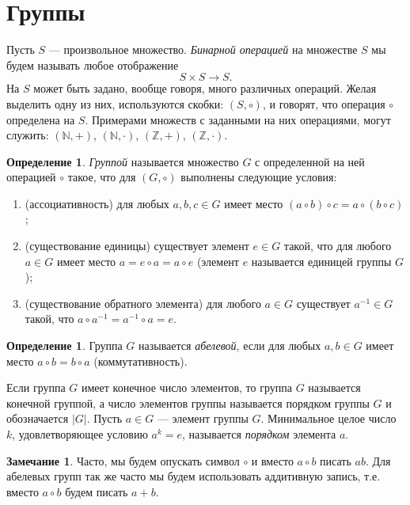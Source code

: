 \documentclass[12pt, titlepage, oneside]{amsbook}
\newcommand{\NN}{\mathbb{N}}
\newcommand{\ZZ}{\mathbb{Z}}
\theoremstyle{definition}
\newtheorem{definition}[theorem]{Определение}
\newtheorem{remark}[theorem]{Замечание}
\theoremstyle{remark}
\begin{document}
\section{Группы}

Пусть $S$ --- произвольное множество. \emph{Бинарной операцией} на
множестве $S$ мы будем называть любое отображение
$$S\times S\rightarrow S.$$ На $S$ может быть задано, вообще говоря, много различных
операций. Желая выделить одну из них, используются скобки:
$(S,\circ)$, и говорят, что операция $\circ$  определена на $S$.
Примерами множеств с заданными на них операциями, могут служить:
$(\NN,+)$, $(\NN,\cdot)$, $(\ZZ,+)$, $(\ZZ,\cdot)$.

\begin{definition}
	\emph{Группой} называется множество $G$ с определенной на ней операцией
	$\circ$ такое, что для $(G,\circ)$ выполнены следующие условия:
	\begin{enumerate}
		\item (ассоциативность) для любых $a,b,c\in G$ имеет место $(a\circ b)\circ
			      c=a\circ (b\circ c)$;
		\item (существование единицы) существует элемент $e\in G$ такой, что
		      для любого $a\in G$ имеет место $a=e\circ a=a\circ e$ (элемент $e$
		      называется единицей группы $G$);
		\item (существование обратного элемента) для любого $a\in G$
		      существует $a^{-1}\in G$ такой, что $a\circ a^{-1}=a^{-1}\circ a=e$.
	\end{enumerate}
\end{definition}

\begin{definition}
	Группа $G$ называется \emph{абелевой}, если для любых $a,b\in G$
	имеет место $a\circ b=b\circ a$ (коммутативность).
\end{definition}

Если группа $G$ имеет конечное число элементов, то группа $G$
называется конечной группой, а число элементов группы называется
порядком группы $G$ и обозначается $|G|$. Пусть $a\in G$ --- элемент
группы $G$. Минимальное целое число $k$, удовлетворяющее условию
$a^k=e$, называется \emph{порядком} элемента $a$.

\begin{remark}
	Часто, мы будем опускать символ $\circ$ и вместо $a\circ b$ писать
	$ab$. Для абелевых групп так же часто мы будем использовать
	аддитивную запись, т.е. вместо $a\circ b$ будем писать $a+b$.
\end{remark}
\end{document}

